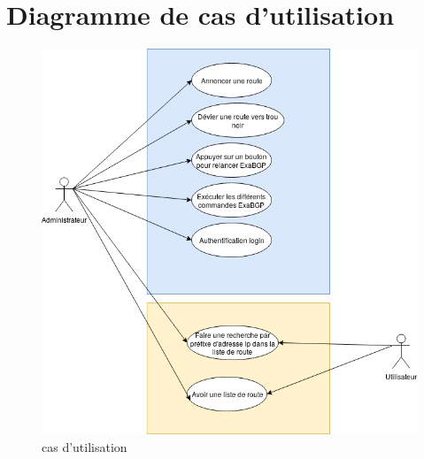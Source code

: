 \section{Diagramme de cas d'utilisation}
\begin{center}
\begin{figure}[h]
\includegraphics[scale=0.5]{img/diagramme_utilisation.png}
\caption{cas d'utilisation}
\end{figure}
\end{center}

